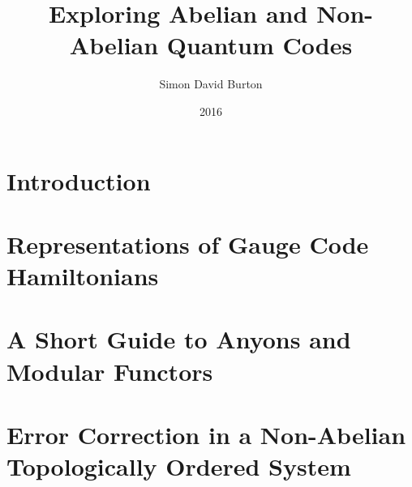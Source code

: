 \documentclass[11pt,twoside,openright]{report}
\title{Exploring Abelian and Non-Abelian Quantum Codes}
\author{Simon David Burton}
\date{2016}
\begin{document}
\maketitle


\declaration


\tableofcontents

\chapter{Introduction}

%
%


\chapter{Representations of Gauge Code Hamiltonians}






\chapter{A Short Guide to Anyons and Modular Functors}



\chapter{Error Correction in a Non-Abelian Topologically Ordered System}





{}

\end{document}
